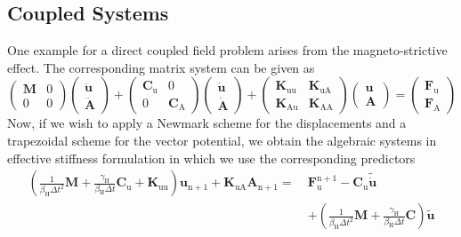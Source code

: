 \subsection{Coupled Systems}
One example for a direct coupled field problem arises from the magneto-strictive effect. The
corresponding matrix system can be given as
\begin{equation}
\left( \begin{array}{cc}
\mathbf{M} & 0 \\ 0 & 0 \end{array} \right) \left( \begin{array}{c} \mathbf{\ddot{u}} \\ \mathbf{\ddot{A}} \end{array}
\right) +
\left( \begin{array}{cc}
\mathbf{C}_{\mathrm{u}} & 0 \\ 0 & \mathbf{C}_\mathrm{A} \end{array} \right) \left( \begin{array}{c} \mathbf{\dot{u}} \\
\mathbf{\dot{A}} \end{array}
\right) + 
\left( \begin{array}{cc}
\mathbf{K}_{\mathrm{uu}} & \mathbf{K}_{\mathrm{uA}} \\ \mathbf{K}_{\mathrm{Au}} & \mathbf{K}_\mathrm{AA} \end{array} \right) \left( \begin{array}{c} \mathbf{u} \\
\mathbf{A} \end{array}
\right) = \left( \begin{array}{c} \mathbf{F}_\mathrm{u} \\ \mathbf{F}_{\mathrm{A}} \end{array} \right)
\end{equation}
Now, if we wish to apply a Newmark scheme for the displacements and a trapezoidal scheme for the
vector potential, we obtain the algebraic systems in effective stiffness formulation in which we
use the corresponding predictors
\begin{equation}
\begin{aligned}
\left(\frac{1}{\beta_\mathrm{H} \Delta t^2} \mathbf{M} + \frac{\gamma_\mathrm{H}}{\beta_\mathrm{H} \Delta t} \mathbf{C}_\mathrm{u}
+ \mathbf{K}_\mathrm{uu} \right) \mathbf{u}_{\mathrm{n}+1} + \mathbf{K}_\mathrm{uA} \mathbf{A}_{\mathrm{n} + 1} = \ 
&\mathbf{F}_{\mathrm{u}}^{\mathrm{n}+1} - \mathbf{C}_\mathrm{u} \mathbf{\tilde{\dot{u}}} \\
&+ \left(\frac{1}{\beta_\mathrm{H} \Delta
t^2} \mathbf{M} + \frac{\gamma_\mathrm{H}}{\beta_\mathrm{H} \Delta t} \mathbf{C}\right) \mathbf{\tilde{u}}\\
\end{aligned}
\end{equation}
